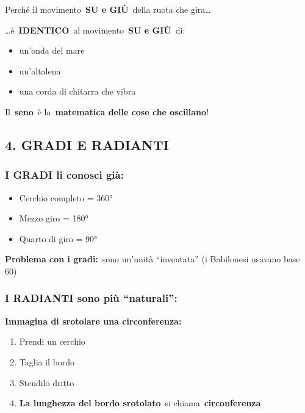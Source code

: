 \documentclass[
]{article}
\providecommand{\tightlist}{%
  \setlength{\itemsep}{0pt}\setlength{\parskip}{0pt}}
\begin{document}
Perché il movimento~\textbf{SU e GIÙ}~della ruota che gira\ldots{}

\ldots è~\textbf{IDENTICO}~al movimento~\textbf{SU e GIÙ}~di:

\begin{itemize}
\tightlist
\item
  un'onda del mare
\item
  un'altalena
\item
  una corda di chitarra che vibra
\end{itemize}

Il~\textbf{seno}~è la~\textbf{matematica delle cose che oscillano}!

\hypertarget{gradi-e-radianti}{%
\subsection{4. GRADI E RADIANTI}\label{gradi-e-radianti}}

\hypertarget{i-gradi-li-conosci-giuxe0}{%
\subsubsection{\texorpdfstring{\textbf{I GRADI li conosci già:}}{I GRADI li conosci già:}}\label{i-gradi-li-conosci-giuxe0}}

\begin{itemize}
\tightlist
\item
  Cerchio completo = 360°
\item
  Mezzo giro = 180°
\item
  Quarto di giro = 90°
\end{itemize}

\textbf{Problema con i gradi:}~sono un'unità ``inventata'' (i Babilonesi usavano base 60)

\hypertarget{i-radianti-sono-piuxf9-naturali}{%
\subsubsection{\texorpdfstring{\textbf{I RADIANTI sono più ``naturali'':}}{I RADIANTI sono più ``naturali'':}}\label{i-radianti-sono-piuxf9-naturali}}

\textbf{Immagina di srotolare una circonferenza:}

\begin{enumerate}
\def\labelenumi{\arabic{enumi}.}
\tightlist
\item
  Prendi un cerchio
\item
  Taglia il bordo
\item
  Stendilo dritto
\item
  \textbf{La lunghezza del bordo srotolato}~si chiama~\textbf{circonferenza}
\end{enumerate}
\end{document}
